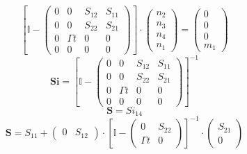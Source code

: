 \[ \left[ \mathbb{I}  - \left(\begin{smallmatrix} 0 & 0 & S_{12} &
S_{11} \\ 0 & 0 & S_{22} & S_{21} \\ 0 & \Gamma t & 0 & 0 \\ 0 & 0 & 0
& 0 \end{smallmatrix}\right)\right] \cdot \left(\begin{smallmatrix}
n_{2} \\ n_{3} \\ n_{4} \\ n_{1} \end{smallmatrix}\right) =
\left(\begin{smallmatrix} 0 \\ 0 \\ 0 \\ m_{1}
\end{smallmatrix}\right) \]
\[ \mathbf{Si} = \left[ \mathbb{I}  - \left(\begin{smallmatrix} 0 & 0
& S_{12} & S_{11} \\ 0 & 0 & S_{22} & S_{21} \\ 0 & \Gamma t & 0 & 0
\\ 0 & 0 & 0 & 0 \end{smallmatrix}\right) \right]^{-1} \]
\[ \mathbf{S} = Si_{14} \]
\[ \mathbf{S} = S_{11} + \left(\begin{smallmatrix} 0 & S_{12}
\end{smallmatrix}\right) \cdot \left[ \mathbb{I}  -
\left(\begin{smallmatrix} 0 & S_{22} \\ \Gamma t & 0
\end{smallmatrix}\right) \right]^{-1} \cdot\left(\begin{smallmatrix}
S_{21} \\ 0 \end{smallmatrix}\right) \]
